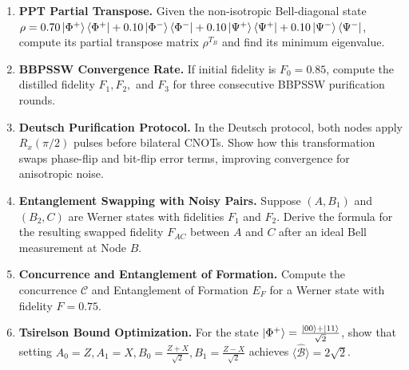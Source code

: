 \begin{enumerate}[label=\textbf{3.\arabic*.}]
    \item \textbf{PPT Partial Transpose.} Given the non-isotropic Bell-diagonal state $\rho = 0.70\ket{\Phi^+}\bra{\Phi^+} + 0.10\ket{\Phi^-}\bra{\Phi^-} + 0.10\ket{\Psi^+}\bra{\Psi^+} + 0.10\ket{\Psi^-}\bra{\Psi^-}$, compute its partial transpose matrix $\rho^{T_B}$ and find its minimum eigenvalue.
    
    \item \textbf{BBPSSW Convergence Rate.} If initial fidelity is $F_0 = 0.85$, compute the distilled fidelity $F_1, F_2,$ and $F_3$ for three consecutive BBPSSW purification rounds.
    
    \item \textbf{Deutsch Purification Protocol.} In the Deutsch protocol, both nodes apply $R_x(\pi/2)$ pulses before bilateral CNOTs. Show how this transformation swaps phase-flip and bit-flip error terms, improving convergence for anisotropic noise.
    
    \item \textbf{Entanglement Swapping with Noisy Pairs.} Suppose $(A, B_1)$ and $(B_2, C)$ are Werner states with fidelities $F_1$ and $F_2$. Derive the formula for the resulting swapped fidelity $F_{AC}$ between $A$ and $C$ after an ideal Bell measurement at Node $B$.
    
    \item \textbf{Concurrence and Entanglement of Formation.} Compute the concurrence $\mathcal{C}$ and Entanglement of Formation $E_F$ for a Werner state with fidelity $F = 0.75$.
    
    \item \textbf{Tsirelson Bound Optimization.} For the state $\ket{\Phi^+} = \frac{\ket{00}+\ket{11}}{\sqrt{2}}$, show that setting $A_0 = Z, A_1 = X, B_0 = \frac{Z+X}{\sqrt{2}}, B_1 = \frac{Z-X}{\sqrt{2}}$ achieves $\langle \hat{\mathcal{B}} \rangle = 2\sqrt{2}$.
\end{enumerate}
